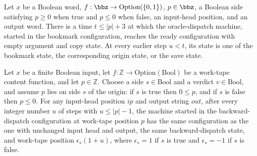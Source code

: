 \begin{theorem}
\label{Turing.oraclePrepare}
\leanok
{}
Let $x$ be a Boolean word, $f:\bbz\to\mathrm{Option}(\{0,1\})$, $p\in\bbz$, a Boolean
side satisfying $p\ge0$ when true and $p\le0$ when false, an input-head position, and an
output word. There is a time $t\le |p|+3$ at which the oracle-dispatch machine, started
in the bookmark configuration, reaches the ready configuration with empty argument and
copy state. At every earlier step $u<t$, its state is one of the bookmark state, the
corresponding origin state, or the save state.
\end{theorem}

\begin{theorem}
\label{Turing.oracleBack_run}
\leanok
{}
Let $x$ be a finite Boolean input, let
$f\colon\mathbb{Z}\to\mathrm{Option}(\mathrm{Bool})$ be a work-tape content function,
and let $p\in\mathbb{Z}$. Choose a side $s\in\mathrm{Bool}$ and a verdict
$v\in\mathrm{Bool}$, and assume $p$ lies on side $s$ of the origin: if $s$ is true then
$0\le p$, and if $s$ is false then $p\le 0$. For any input-head position $ip$ and output
string $out$, after every integer number $u$ of steps with $u\le |p|-1$, the machine
started in the backward-dispatch configuration at work-tape position $p$ has the same
configuration as the one with unchanged input head and output, the same
backward-dispatch state, and work-tape position $\epsilon_s(1+u)$, where $\epsilon_s=1$
if $s$ is true and $\epsilon_s=-1$ if $s$ is false.
\end{theorem}

